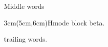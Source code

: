 \documentclass{article}
\begin{document}
Middle words \begin{textblock*}{3cm}(5cm,6cm)Hmode block beta.\end{textblock*} trailing words.
\end{document}
